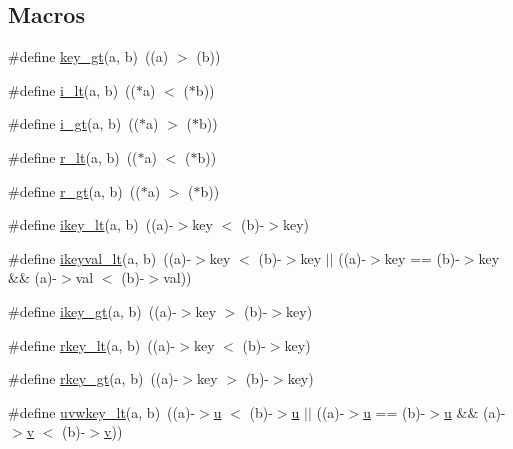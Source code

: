 \subsection*{Macros}
\begin{DoxyCompactItemize}
\item 
\#define \hyperlink{a00206_a89b02dbc0bd6ec64351eff7c65c6440e}{key\+\_\+gt}(a,  b)~((a) $>$ (b))
\item 
\#define \hyperlink{a00206_ae77972878944453796c3d41983494b4f}{i\+\_\+lt}(a,  b)~(($\ast$a) $<$ ($\ast$b))
\item 
\#define \hyperlink{a00206_a7f7479725208e56a4d49209aa2301a13}{i\+\_\+gt}(a,  b)~(($\ast$a) $>$ ($\ast$b))
\item 
\#define \hyperlink{a00206_ab3cfc653c73e55f5579f5ccdd879c4ab}{r\+\_\+lt}(a,  b)~(($\ast$a) $<$ ($\ast$b))
\item 
\#define \hyperlink{a00206_adf478b60dd57c11213ac276c4ca47e90}{r\+\_\+gt}(a,  b)~(($\ast$a) $>$ ($\ast$b))
\item 
\#define \hyperlink{a00206_ae2275beb4f8212a5a1b8299bd57f0595}{ikey\+\_\+lt}(a,  b)~((a)-\/$>$key $<$ (b)-\/$>$key)
\item 
\#define \hyperlink{a00206_a32b2339a7d779103be00197670540fd3}{ikeyval\+\_\+lt}(a,  b)~((a)-\/$>$key $<$ (b)-\/$>$key $\vert$$\vert$ ((a)-\/$>$key == (b)-\/$>$key \&\& (a)-\/$>$val $<$ (b)-\/$>$val))
\item 
\#define \hyperlink{a00206_af802b818526cc3a70c669f0b3115aa7f}{ikey\+\_\+gt}(a,  b)~((a)-\/$>$key $>$ (b)-\/$>$key)
\item 
\#define \hyperlink{a00206_a3ba1de233f80a359f3ee192171e838f5}{rkey\+\_\+lt}(a,  b)~((a)-\/$>$key $<$ (b)-\/$>$key)
\item 
\#define \hyperlink{a00206_a9d453b11fd5d7d10eee018e8a65e68a8}{rkey\+\_\+gt}(a,  b)~((a)-\/$>$key $>$ (b)-\/$>$key)
\item 
\#define \hyperlink{a00206_a426924f08f3b3d6f3aeac24639e56986}{uvwkey\+\_\+lt}(a,  b)~((a)-\/$>$\hyperlink{a00605_a6277e2a7446059985dc9bcf0a4ac1a8f}{u} $<$ (b)-\/$>$\hyperlink{a00605_a6277e2a7446059985dc9bcf0a4ac1a8f}{u} $\vert$$\vert$ ((a)-\/$>$\hyperlink{a00605_a6277e2a7446059985dc9bcf0a4ac1a8f}{u} == (b)-\/$>$\hyperlink{a00605_a6277e2a7446059985dc9bcf0a4ac1a8f}{u} \&\& (a)-\/$>$\hyperlink{a00605_ac4055e3a20b6b3af3d10590ea446ef6c}{v} $<$ (b)-\/$>$\hyperlink{a00605_ac4055e3a20b6b3af3d10590ea446ef6c}{v}))
\end{DoxyCompactItemize}
